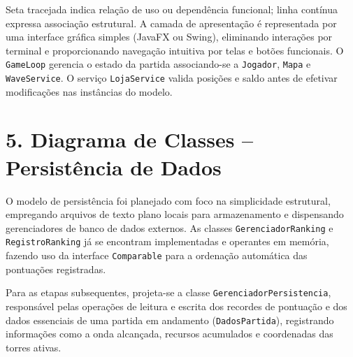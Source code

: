 \documentclass[11pt,a4paper]{article}
\begin{document}
Seta tracejada indica relação de uso ou dependência funcional; linha contínua expressa associação estrutural. A camada de apresentação é representada por uma interface gráfica simples (JavaFX ou Swing), eliminando interações por terminal e proporcionando navegação intuitiva por telas e botões funcionais. O \texttt{GameLoop} gerencia o estado da partida associando-se a \texttt{Jogador}, \texttt{Mapa} e \texttt{WaveService}. O serviço \texttt{LojaService} valida posições e saldo antes de efetivar modificações nas instâncias do modelo.

\clearpage
\section*{5. Diagrama de Classes -- Persistência de Dados}
O modelo de persistência foi planejado com foco na simplicidade estrutural, empregando arquivos de texto plano locais para armazenamento e dispensando gerenciadores de banco de dados externos. As classes \texttt{GerenciadorRanking} e \texttt{RegistroRanking} já se encontram implementadas e operantes em memória, fazendo uso da interface \texttt{Comparable} para a ordenação automática das pontuações registradas.

Para as etapas subsequentes, projeta-se a classe \texttt{GerenciadorPersistencia}, responsável pelas operações de leitura e escrita dos recordes de pontuação e dos dados essenciais de uma partida em andamento (\texttt{DadosPartida}), registrando informações como a onda alcançada, recursos acumulados e coordenadas das torres ativas.
\end{document}
